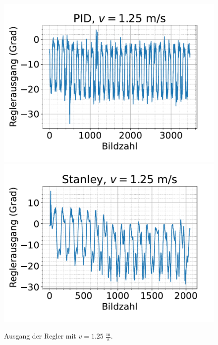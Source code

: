 \documentclass[arbeit=studie,oneside,BCOR=12mm]{ArbeitRST}
\begin{document}
\begin{figure}[h]
    \centering
    \includegraphics[scale=0.47]{pid1.25}
    \includegraphics[scale=0.47]{Stan1.25}
    \caption{Ausgang der Regler mit $v = 1.25$ $\frac{\mathrm{m}}{\mathrm{s}}$.}
    \label{reg:1.25}
\end{figure}
\end{document}
